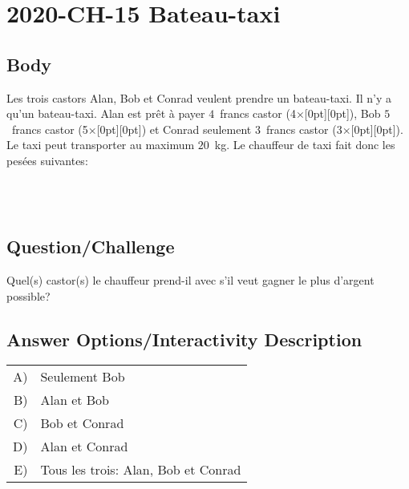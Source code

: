 \documentclass[a4paper,11pt]{report}
\newcommand{\taskGraphicsFolder}{..}
\begin{document}
\section*{\centering{} 2020-CH-15 Bateau-taxi}


\subsection*{Body}

{\centering%
\par}

Les trois castors Alan, Bob et Conrad veulent prendre un bateau-taxi. Il n’y a qu’un bateau-taxi. Alan est prêt à payer $4$~francs castor (4\ensuremath{\times}\raisebox{-0.5ex}[0pt][0pt]{}), Bob $5$~francs castor (5\ensuremath{\times}\raisebox{-0.5ex}[0pt][0pt]{}) et Conrad seulement $3$~francs castor (3\ensuremath{\times}\raisebox{-0.5ex}[0pt][0pt]{}). Le taxi peut transporter au maximum $20$~kg. Le chauffeur de taxi fait donc les pesées suivantes:

{\centering%
\raisebox{-0.5ex}{} \\
 \\
\raisebox{-0.5ex}{}\par}

{\em

\subsection*{Question/Challenge}

Quel(s) castor(s) le chauffeur prend-il avec s’il veut gagner le plus d’argent possible?

}\begingroup
\renewcommand{\arraystretch}{1.5}
\subsection*{Answer Options/Interactivity Description}

\begin{tabular}{ @{} r l @{} }
  A) & Seulement Bob \\ 
  B) & Alan et Bob \\ 
  C) & Bob et Conrad \\ 
  D) & Alan et Conrad \\ 
  E) & Tous les trois: Alan, Bob et Conrad
\end{tabular}
\end{document}
